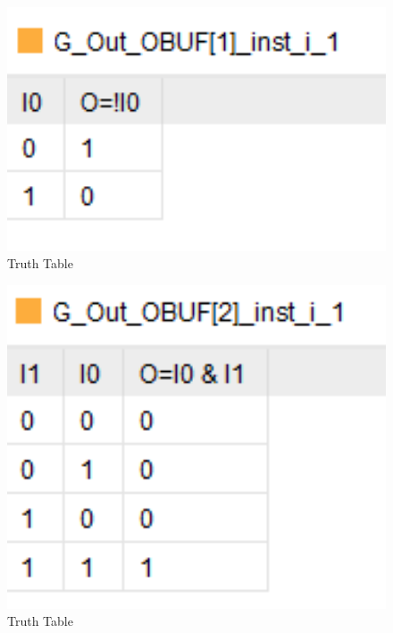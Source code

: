 \documentclass{article}
\begin{document}
\begin{figure}[h]
\begin{center}
\includegraphics[width=1\textwidth]{GatesTruthTable.png} %
\caption{Truth Table}
\end{center}
\end{figure}


\begin{figure}[h]
\begin{center}
\includegraphics[width=1\textwidth]{GatesTruthTableCont.png} %
\caption{Truth Table}
\end{center}
\end{figure}
\end{document}
